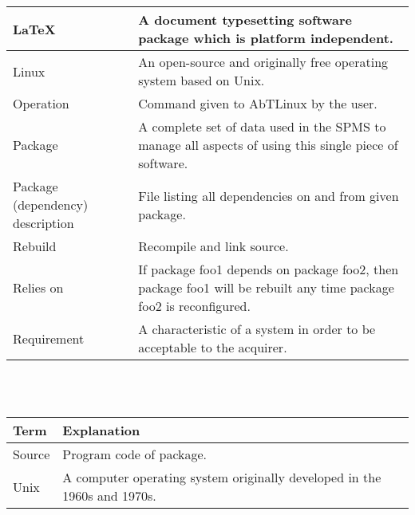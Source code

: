 \begin{tabular}[t]{|p{4.5cm}|p{8.5cm}|}
\hline
LaTeX & A document typesetting software package which is platform independent.\\
\hline
Linux & An open-source and originally free operating system based on Unix.\\
\hline
Operation & Command given to AbTLinux by the user.\\
\hline 
Package & A complete set of data used in the SPMS to manage all aspects of using this single piece of software.\\
\hline
Package (dependency) description & File listing all dependencies on and from given package.\\
\hline
Rebuild & Recompile and link source.\\
\hline
Relies on & If package foo1 depends on package foo2, then package foo1 will be rebuilt any time package foo2 is reconfigured.\\
\hline
Requirement & A characteristic of a system in order to be acceptable to the acquirer.\\
\hline
\end{tabular}
\\
\\

\begin{tabular}[t]{|p{4.5cm}|p{8.5cm}|}
\hline
\textbf{Term} & \textbf{Explanation} \\
\hline
Source & Program code of package.\\
\hline
Unix	& A computer operating system originally developed in the 1960s and 1970s.\\
\hline
\end{tabular}
